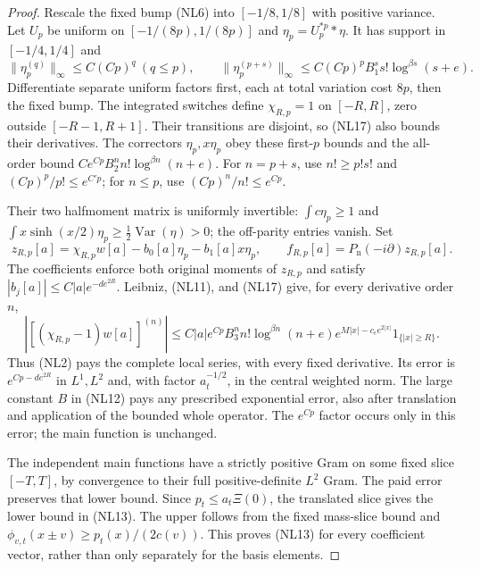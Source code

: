 \documentclass[11pt]{article}
\theoremstyle{remark}\newtheorem{remark}[theorem]{Remark}
\begin{document}
\begin{proof}
Rescale the fixed bump (NL6) into \([-1/8,1/8]\) with positive
variance. Let \(U_p\) be uniform on \([-1/(8p),1/(8p)]\) and
\(\eta_p=U_p^{*p}*\eta\). It has support in \([-1/4,1/4]\) and
\[
 \|\eta_p^{(q)}\|_\infty\le C(Cp)^q\ (q\le p),\qquad
 \|\eta_p^{(p+s)}\|_\infty
       \le C(Cp)^pB_1^ss!\log^{\beta s}(s+e).                  \tag{NL17}
\]
Differentiate separate uniform factors first, each at total
variation cost \(8p\), then the fixed bump. The integrated
switches define \(\chi_{R,p}=1\) on \([-R,R]\), zero outside
\([-R-1,R+1]\). Their transitions are disjoint, so (NL17)
also bounds their derivatives. The correctors
\(\eta_p,x\eta_p\) obey these first-\(p\) bounds and the
all-order bound \(Ce^{Cp}B_2^nn!\log^{\beta n}(n+e)\).
For \(n=p+s\), use \(n!\ge p!s!\) and
\((Cp)^p/p!\le e^{C'p}\); for \(n\le p\), use
\((Cp)^n/n!\le e^{Cp}\).

Their two halfmoment matrix is uniformly invertible:
\(\int c\eta_p\ge1\) and
\(\int x\sinh(x/2)\eta_p\ge\frac12\operatorname{Var}(\eta)>0\);
the off-parity entries vanish. Set
\[
 z_{R,p}[a]=\chi_{R,p}w[a]-b_0[a]\eta_p-b_1[a]x\eta_p,\qquad
 f_{R,p}[a]=P_{\mathrm n}(-i\partial)z_{R,p}[a].                \tag{NL18}
\]
The coefficients enforce both original moments of \(z_{R,p}\)
and satisfy \(|b_j[a]|\le C|a|e^{-d e^{2R}}\).
Leibniz, (NL11), and (NL17) give, for every derivative order \(n\),
\[
 |[(\chi_{R,p}-1)w[a]]^{(n)}|
 \le C|a|e^{Cp}B_3^nn!\log^{\beta n}(n+e)
       e^{M|x|-c_\epsilon e^{2|x|}}1_{\{|x|\ge R\}} .
\]
Thus (NL2) pays the complete local series, with every fixed
derivative. Its error is \(e^{Cp-d e^{2R}}\) in \(L^1,L^2\)
and, with factor \(a_t^{-1/2}\), in the central weighted norm.
The large constant \(B\) in (NL12) pays any prescribed exponential
error, also after translation and application of the bounded
whole operator. The \(e^{Cp}\) factor occurs only in this error;
the main function is unchanged.

The independent main functions have a strictly positive Gram on
some fixed slice \([-T,T]\), by convergence to their full
positive-definite \(L^2\) Gram. The paid error preserves that
lower bound. Since \(p_t\le a_t\Xi(0)\),
the translated slice gives the lower bound in (NL13).
The upper follows from the fixed mass-slice bound and
\(\phi_{v,t}(x\pm v)\ge p_t(x)/(2c(v))\).
This proves (NL13) for every coefficient vector, rather than
only separately for the basis elements.


\end{proof}
\end{document}
